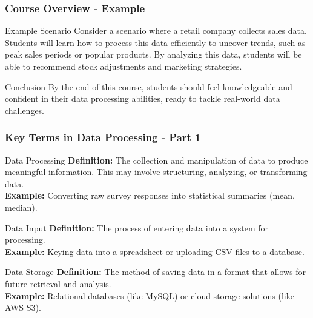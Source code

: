 \documentclass[aspectratio=169]{beamer}
\begin{document}
\begin{frame}[fragile]
    \frametitle{Course Overview - Example}
    \begin{block}{Example Scenario}
        Consider a scenario where a retail company collects sales data. Students will learn how to process this data efficiently to uncover trends, such as peak sales periods or popular products. By analyzing this data, students will be able to recommend stock adjustments and marketing strategies.
    \end{block}

    \begin{block}{Conclusion}
        By the end of this course, students should feel knowledgeable and confident in their data processing abilities, ready to tackle real-world data challenges.
    \end{block}
\end{frame}

\begin{frame}[fragile]
    \frametitle{Key Terms in Data Processing - Part 1}
    \begin{block}{Data Processing}
        \textbf{Definition:} The collection and manipulation of data to produce meaningful information. This may involve structuring, analyzing, or transforming data.\\
        \textbf{Example:} Converting raw survey responses into statistical summaries (mean, median).
    \end{block}

    \begin{block}{Data Input}
        \textbf{Definition:} The process of entering data into a system for processing.\\
        \textbf{Example:} Keying data into a spreadsheet or uploading CSV files to a database.
    \end{block}

    \begin{block}{Data Storage}
        \textbf{Definition:} The method of saving data in a format that allows for future retrieval and analysis.\\
        \textbf{Example:} Relational databases (like MySQL) or cloud storage solutions (like AWS S3).
    \end{block}
\end{frame}
\end{document}
